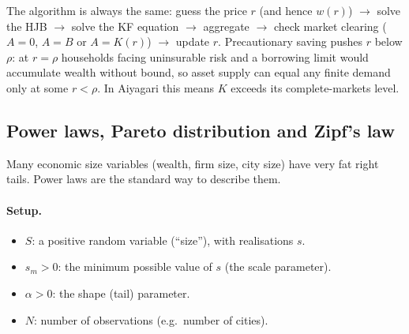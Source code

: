 \begin{tipbox}
The algorithm is always the same: guess the price $r$ (and hence $w(r)$) $\to$ solve the HJB $\to$ solve the KF equation $\to$ aggregate $\to$ check market clearing ($A=0$, $A=B$ or $A=K(r)$) $\to$ update $r$. Precautionary saving pushes $r$ below $\rho$: at $r=\rho$ households facing uninsurable risk and a borrowing limit would accumulate wealth without bound, so asset supply can equal any finite demand only at some $r<\rho$. In Aiyagari this means $K$ exceeds its complete-markets level.
\end{tipbox}

\subsection{Power laws, Pareto distribution and Zipf's law }

Many economic size variables (wealth, firm size, city size) have very fat right tails. Power laws are the standard way to describe them.

\paragraph{Setup.}
\begin{itemize}
  \item $S$: a positive random variable (``size''), with realisations $s$.
  \item $s_m>0$: the minimum possible value of $s$ (the scale parameter).
  \item $\alpha>0$: the shape (tail) parameter.
  \item $N$: number of observations (e.g.\ number of cities).
\end{itemize}

